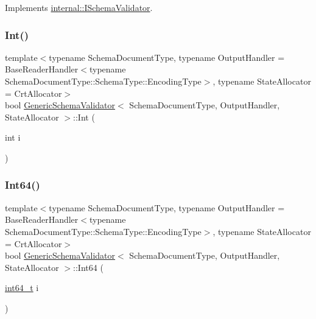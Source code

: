 Implements \hyperlink{classinternal_1_1ISchemaValidator_aa27d587f8e6fa2b95235a6ffa077429d}{internal\+::\+I\+Schema\+Validator}.

\mbox{\label{classGenericSchemaValidator_ad823c29990225661a4df69d34647b659}} 
\subsubsection{\texorpdfstring{Int()}{Int()}}
{\footnotesize\ttfamily template$<$typename Schema\+Document\+Type, typename Output\+Handler = Base\+Reader\+Handler$<$typename Schema\+Document\+Type\+::\+Schema\+Type\+::\+Encoding\+Type$>$, typename State\+Allocator = Crt\+Allocator$>$ \\
bool \hyperlink{classGenericSchemaValidator}{Generic\+Schema\+Validator}$<$ Schema\+Document\+Type, Output\+Handler, State\+Allocator $>$\+::Int (\begin{DoxyParamCaption}\item[{int}]{i }\end{DoxyParamCaption})\hspace{0.3cm}{\ttfamily [inline]}}

\mbox{\label{classGenericSchemaValidator_ac5a9e416e18129a7b787f251019a828f}} 
\subsubsection{\texorpdfstring{Int64()}{Int64()}}
{\footnotesize\ttfamily template$<$typename Schema\+Document\+Type, typename Output\+Handler = Base\+Reader\+Handler$<$typename Schema\+Document\+Type\+::\+Schema\+Type\+::\+Encoding\+Type$>$, typename State\+Allocator = Crt\+Allocator$>$ \\
bool \hyperlink{classGenericSchemaValidator}{Generic\+Schema\+Validator}$<$ Schema\+Document\+Type, Output\+Handler, State\+Allocator $>$\+::Int64 (\begin{DoxyParamCaption}\item[{\hyperlink{stdint_8h_a414156feea104f8f75b4ed9e3121b2f6}{int64\+\_\+t}}]{i }\end{DoxyParamCaption})\hspace{0.3cm}{\ttfamily [inline]}}

